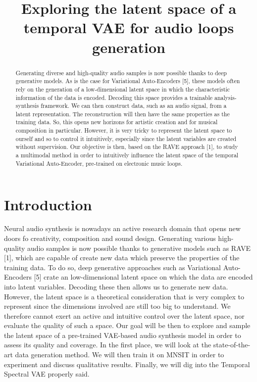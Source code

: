 \documentclass{article}
\title{Exploring the latent space of a temporal VAE for audio loops generation}
\date{}
\begin{document}
\maketitle
\vfill
\hspace*{-3cm}\hspace*{1cm}


\begin{abstract}
    Generating diverse and high-quality audio samples is now possible thanks to deep generative models. As is the case for Variational Auto-Encoders [5], these models often rely on the generation of a low-dimensional latent space in which the characteristic information of the data is encoded. Decoding this space provides a trainable analysis-synthesis framework. We can then construct data, such as an audio signal, from a latent representation. The reconstruction will then have the same properties as the training data. So, this opens new horizons for artistic creation and for musical composition in particular. However, it is very tricky to represent the latent space to ourself and so to control it intuitively, especially since the latent variables are created without supervision. Our objective is then, based on the RAVE approach [1], to study a multimodal method in order to intuitively influence the latent space of the temporal Variational Auto-Encoder, pre-trained on electronic music loops.

\end{abstract}


\section{Introduction}

Neural audio synthesis is nowadays an active research domain that opens new doors fo creativity, composition and sound design. Generating various high-quality audio samples is now possible thanks to generative models such as RAVE [1], which are capable of create new data which preserve the properties of the training data. To do so, deep generative approaches such as Variational Auto-Encoders [5] crate an low-dimensional latent space on which the data are encoded into latent variables. Decoding these then allows us to generate new data. However, the latent space is a theoretical consideration that is very complex to represent since the dimensions involved are still too big to understand. We therefore cannot exert an active and intuitive control over the latent space, nor evaluate the quality of such a space. Our goal will be then to explore and sample the latent space of a pre-trained VAE-based audio synthesis model in order to assess its quality and coverage. In the first place, we will look at the state-of-the-art data generation method. We will then train it on MNSIT in order to experiment and discuss qualitative results. Finally, we will dig into the Temporal Spectral VAE properly said.
\end{document}
